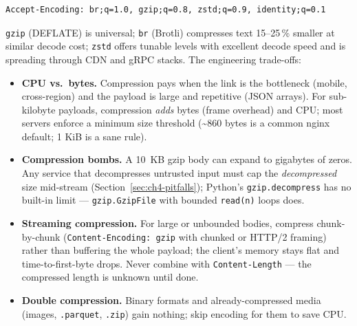 \begin{verbatim}
Accept-Encoding: br;q=1.0, gzip;q=0.8, zstd;q=0.9, identity;q=0.1
\end{verbatim}

\texttt{gzip} (DEFLATE) is universal; \texttt{br} (Brotli) compresses text 15--25\,\%
smaller at similar decode cost; \texttt{zstd} offers tunable levels with excellent
decode speed and is spreading through CDN and gRPC stacks. The engineering
trade-offs:

\begin{itemize}
  \item \textbf{CPU vs.\ bytes.} Compression pays when the link is the bottleneck
        (mobile, cross-region) and the payload is large and repetitive (JSON
        arrays). For sub-kilobyte payloads, compression \emph{adds} bytes (frame
        overhead) and CPU; most servers enforce a minimum size threshold
        (\textasciitilde860 bytes is a common nginx default; 1 KiB is a sane rule).
  \item \textbf{Compression bombs.} A 10~KB gzip body can expand to gigabytes of
        zeros. Any service that decompresses untrusted input must cap the
        \emph{decompressed} size mid-stream (Section~\ref{sec:ch4-pitfalls});
        Python's \texttt{gzip.decompress} has no built-in limit ---
        \texttt{gzip.GzipFile} with bounded \texttt{read(n)} loops does.
  \item \textbf{Streaming compression.} For large or unbounded bodies, compress
        chunk-by-chunk (\texttt{Content-Encoding: gzip} with chunked or HTTP/2
        framing) rather than buffering the whole payload; the client's memory stays
        flat and time-to-first-byte drops. Never combine with
        \texttt{Content-Length} --- the compressed length is unknown until done.
  \item \textbf{Double compression.} Binary formats and already-compressed media
        (images, \texttt{.parquet}, \texttt{.zip}) gain nothing; skip encoding for
        them to save CPU.
\end{itemize}

